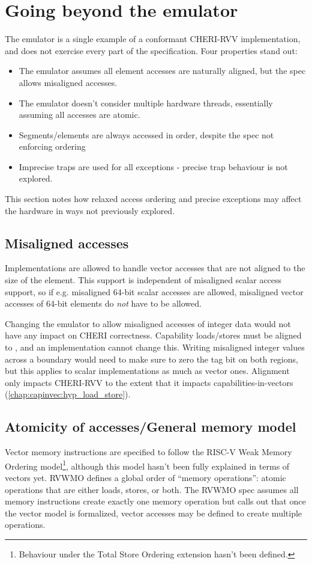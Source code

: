 \section{Going beyond the emulator}
The emulator is a single example of a conformant CHERI-RVV implementation, and does not exercise every part of the specification.
Four properties stand out:
\begin{itemize}
    \item The emulator assumes all element accesses are naturally aligned, but the spec allows misaligned accesses.
    \item The emulator doesn't consider multiple hardware threads, essentially assuming all accesses are atomic.
    \item Segments/elements are always accessed in order, despite the spec not enforcing ordering
    \item Imprecise traps are used for all exceptions - precise trap behaviour is not explored.
\end{itemize}
This section notes how relaxed access ordering and precise exceptions may affect the hardware in ways not previously explored.

\subsection{Misaligned accesses}
Implementations are allowed to handle vector accesses that are not aligned to the size of the element.
This support is independent of misaligned scalar access support, so if e.g. misaligned 64-bit scalar accesses are allowed, misaligned vector accesses of 64-bit elements do \emph{not} have to be allowed.

Changing the emulator to allow misaligned accesses of integer data would not have any impact on CHERI correctness.
Capability loads/stores must be aligned to \cite[Section~3.5.2]{TR-951}, and an implementation cannot change this.
Writing misaligned integer values across a  boundary would need to make sure to zero the tag bit on both regions, but this applies to scalar implementations as much as vector ones.
Alignment only impacts CHERI-RVV to the extent that it impacts capabilities-in-vectors (\cref{chap:capinvec:hyp_load_store}).

\subsection{Atomicity of accesses/General memory model}
Vector memory instructions are specified to follow the RISC-V Weak Memory Ordering model\cite{specification-RVV-v1.0}\footnote{Behaviour under the Total Store Ordering extension hasn't been defined.}, although this model hasn't been fully explained in terms of vectors yet.
RVWMO defines a global order of \enquote{memory operations}: atomic operations that are either loads, stores, or both\cite[Chapter~14]{specification-RISCV-vol1-20191213}.
The RVWMO spec assumes all memory instructions create exactly one memory operation but calls out that once the vector model is formalized, vector accesses may be defined to create multiple operations.

